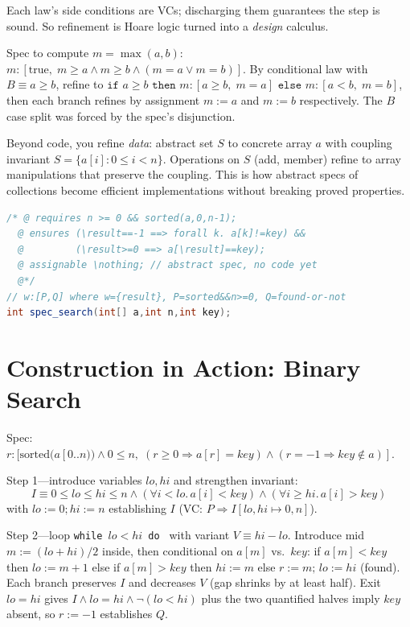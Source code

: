 Each law's side conditions are VCs; discharging them guarantees the step is sound. So refinement is Hoare logic turned into a \emph{design} calculus.

\begin{example}
Spec to compute $m=\max(a,b)$: $m:[ \text{true},\; m\ge a\land m\ge b\land(m=a\lor m=b)]$. By conditional law with $B\equiv a\ge b$, refine to $\texttt{if }a\ge b\texttt{ then }m:[a\ge b,\;m=a]\texttt{ else }m:[a<b,\;m=b]$, then each branch refines by assignment $m:=a$ and $m:=b$ respectively. The $B$ case split was forced by the spec's disjunction.
\end{example}

\begin{remark}
Beyond code, you refine \emph{data}: abstract set $S$ to concrete array $a$ with coupling invariant $S=\{a[i]:0\le i<n\}$. Operations on $S$ (add, member) refine to array manipulations that preserve the coupling. This is how abstract specs of collections become efficient implementations without breaking proved properties.
\end{remark}

\begin{lstlisting}[language=Java, caption={Specification statement as JML contract: the abstract spec to be refined.}, label={lst:spec-java}]
/* @ requires n >= 0 && sorted(a,0,n-1);
  @ ensures (\result==-1 ==> forall k. a[k]!=key) &&
  @         (\result>=0 ==> a[\result]==key);
  @ assignable \nothing; // abstract spec, no code yet
  @*/
// w:[P,Q] where w={result}, P=sorted&&n>=0, Q=found-or-not
int spec_search(int[] a,int n,int key);
\end{lstlisting}

\section{Construction in Action: Binary Search}
\label{sec:binary-search}
Spec: $r:[ \text{sorted}(a[0..n))\land0\le n,\; (r\ge0\Rightarrow a[r]=key)\land(r=-1\Rightarrow key\notin a)]$.

Step 1---introduce variables $lo,hi$ and strengthen invariant:
\[
I\equiv 0\le lo\le hi\le n\land (\forall i<lo.\,a[i]<key)\land(\forall i\ge hi.\,a[i]>key)
\]
with $lo:=0;hi:=n$ establishing $I$ (VC: $P\Rightarrow I[lo,hi\mapsto0,n]$).

Step 2---loop \texttt{while $lo<hi$ do } with variant $V\equiv hi-lo$. Introduce mid $m:=(lo+hi)/2$ inside, then conditional on $a[m]$ vs.\ $key$: if $a[m]<key$ then $lo:=m+1$ else if $a[m]>key$ then $hi:=m$ else $r:=m;\,lo:=hi$ (found). Each branch preserves $I$ and decreases $V$ (gap shrinks by at least half). Exit $lo=hi$ gives $I\land lo=hi\land\neg(lo<hi)$ plus the two quantified halves imply $key$ absent, so $r:=-1$ establishes $Q$.

